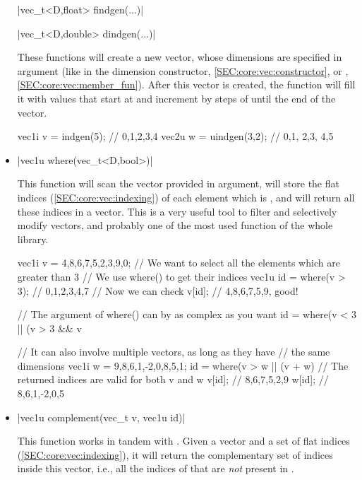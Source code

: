 \documentclass[12pt]{report}
\newenvironment{example}
{
    \begin{mdframed}[style=example,frametitle={Example}]
}
{
    \end{mdframed}
}
\begin{document}
\begin{itemize}
\cppinline|vec_t<D,float>  findgen(...)| 

\cppinline|vec_t<D,double> dindgen(...)| 

These functions will create a new vector, whose dimensions are specified in argument (like in the dimension constructor, \ref{SEC:core:vec:constructor}, or , \ref{SEC:core:vec:member_fun}). After this vector is created, the function will fill it with values that start at  and increment by steps of  until the end of the vector.

\begin{example}
\begin{cppcode}
vec1i v = indgen(5);    // {0,1,2,3,4}
vec2u w = uindgen(3,2); // {{0,1}, {2,3}, {4,5}}
\end{cppcode}
\end{example}

\item \cppinline|vec1u where(vec_t<D,bool>)| 

This function will scan the  vector provided in argument, will store the flat indices (\ref{SEC:core:vec:indexing}) of each element which is , and will return all these indices in a vector. This is a very useful tool to filter and selectively modify vectors, and probably one of the most used function of the whole library.

\begin{example}
\begin{cppcode}
vec1i v = {4,8,6,7,5,2,3,9,0};
// We want to select all the elements which are greater than 3
// We use where() to get their indices
vec1u id = where(v > 3); // {0,1,2,3,4,7}
// Now we can check
v[id]; // {4,8,6,7,5,9}, good!

// The argument of where() can by as complex as you want
id = where(v < 3 || (v > 3 && v %

// It can also involve multiple vectors, as long as they have
// the same dimensions
vec1i w = {9,8,6,1,-2,0,8,5,1};
id = where(v > w || (v + w) %
// The returned indices are valid for both v and w
v[id]; // {8,6,7,5,2,9}
w[id]; // {8,6,1,-2,0,5}
\end{cppcode}
\end{example}

\item \cppinline|vec1u complement(vec_t v, vec1u id)| 

This function works in tandem with . Given a vector  and a set of flat indices  (\ref{SEC:core:vec:indexing}), it will return the complementary set of indices inside this vector, i.e., all the indices of  that are \emph{not} present in .


\end{itemize}
\end{document}
